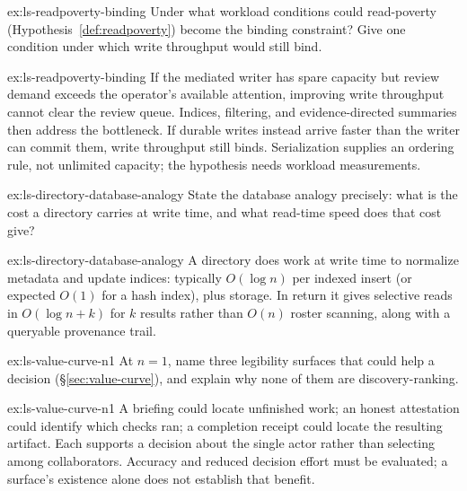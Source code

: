 \documentclass[11pt,a4paper]{article}
\theoremstyle{definition}
\theoremstyle{plain}
\begin{document}

\begin{pdexercise}[kind=Check,rating=1]{ex:ls-readpoverty-binding}
Under what workload conditions could read-poverty
(Hypothesis~\ref{def:readpoverty}) become the binding constraint? Give one
condition under which write throughput would still bind.
\end{pdexercise}
\begin{pdsolution}{ex:ls-readpoverty-binding}
If the mediated writer has spare capacity but review demand exceeds the
operator's available attention, improving write throughput cannot clear the
review queue. Indices, filtering, and evidence-directed summaries then address
the bottleneck. If durable writes instead arrive faster than the writer can
commit them, write throughput still binds. Serialization supplies an ordering
rule, not unlimited capacity; the hypothesis needs workload measurements.
\end{pdsolution}
\begin{pdexercise}[kind=Check,rating=1]{ex:ls-directory-database-analogy}
State the database analogy precisely: what is the
cost a directory carries at write time, and what read-time speed does that cost give?
\end{pdexercise}
\begin{pdsolution}{ex:ls-directory-database-analogy}
A directory does work at write time to normalize metadata and update indices: typically $O(\log n)$ per indexed insert (or expected $O(1)$ for a hash index), plus storage. In return it gives selective reads in $O(\log n+k)$ for $k$ results rather than $O(n)$ roster scanning, along with a queryable provenance trail.
\end{pdsolution}
\begin{pdexercise}[kind=Trace,rating=2]{ex:ls-value-curve-n1}
At $n{=}1$, name three legibility surfaces that could help a decision
(\S\ref{sec:value-curve}), and explain why none of them are discovery-ranking.
\end{pdexercise}
\begin{pdsolution}{ex:ls-value-curve-n1}
A briefing could locate unfinished work; an honest attestation could identify which checks ran; a completion receipt could locate the resulting artifact. Each supports a decision about the single actor rather than selecting among collaborators. Accuracy and reduced decision effort must be evaluated; a surface's existence alone does not establish that benefit.
\end{pdsolution}
\end{document}
